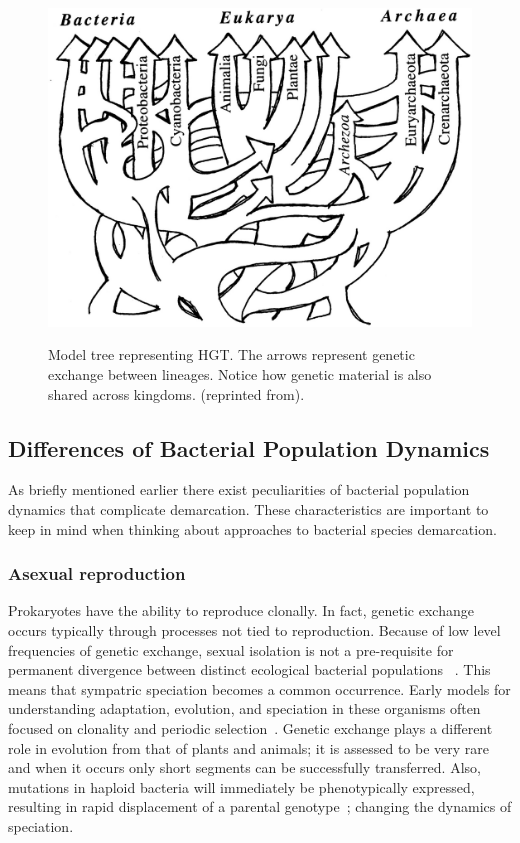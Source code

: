 \begin{figure}
\centering
\includegraphics[scale=0.25]{images/HGTTree-CH1}
\label{fig:HGTmodel}
\caption[Model tree representing HGT.]{Model tree representing HGT. The arrows represent genetic exchange between lineages. Notice how genetic material is also shared across kingdoms. (reprinted from\protect\cite{doolittle1999phylogenetic}).}
\label{fig:HGTmodel}
\end{figure}

\subsection{Differences of Bacterial Population Dynamics}
As briefly mentioned earlier there exist peculiarities of bacterial population dynamics that complicate demarcation.
These characteristics are important to keep in mind when thinking about approaches to bacterial species demarcation.

\subsubsection*{Asexual reproduction}
Prokaryotes have the ability to reproduce clonally.
In fact, genetic exchange occurs typically through processes not tied to reproduction.
Because of low level frequencies of genetic exchange, sexual isolation is not a pre-requisite for permanent divergence between distinct ecological bacterial populations ~\cite{cohan2007systematics}.
This means that sympatric speciation becomes a common occurrence.
Early models for understanding adaptation, evolution, and speciation in these organisms often focused on clonality and periodic selection~\cite{gogarten2002prokaryotic}.
Genetic exchange plays a different role in evolution from that of plants and animals; it is assessed to be very rare and when it occurs only short segments can be successfully transferred.
Also, mutations in haploid bacteria will immediately be phenotypically expressed, resulting in rapid displacement of a parental genotype~\cite{staley1997biodiversity}; changing the dynamics of speciation.

